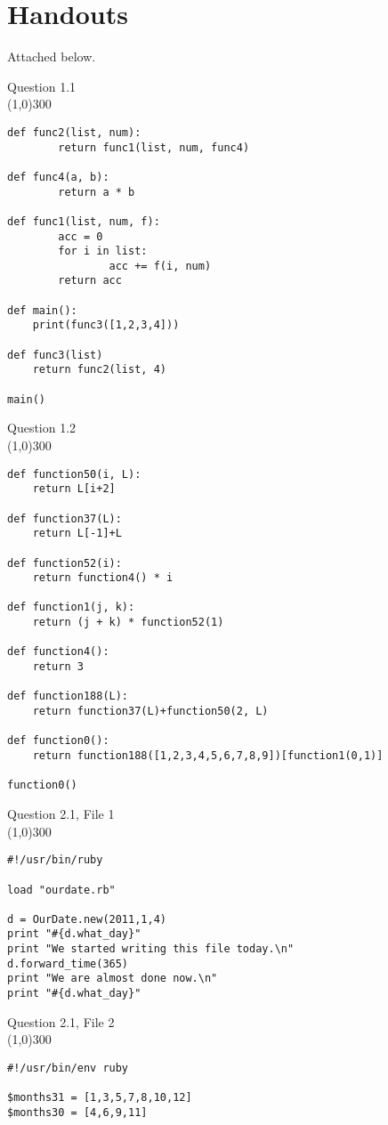 \documentclass{article}
\begin{document}
\section{Handouts}
Attached below.
\newpage
{\Large
Question 1.1 \\
\line(1,0){300}
\begin{verbatim}
def func2(list, num):
        return func1(list, num, func4)

def func4(a, b):
        return a * b

def func1(list, num, f):
        acc = 0
        for i in list:
                acc += f(i, num)
        return acc

def main():
    print(func3([1,2,3,4]))

def func3(list)
    return func2(list, 4)

main()

\end{verbatim}
\newpage
Question 1.2 \\
\line(1,0){300}
\begin{verbatim}
def function50(i, L):
    return L[i+2]

def function37(L):
    return L[-1]+L

def function52(i):
    return function4() * i

def function1(j, k):
    return (j + k) * function52(1)

def function4():
    return 3

def function188(L):
    return function37(L)+function50(2, L)

def function0():
    return function188([1,2,3,4,5,6,7,8,9])[function1(0,1)]

function0()
\end{verbatim}

\newpage
Question 2.1, File 1 \\
\line(1,0){300}
\begin{verbatim}
#!/usr/bin/ruby

load "ourdate.rb"

d = OurDate.new(2011,1,4)
print "#{d.what_day}"
print "We started writing this file today.\n"
d.forward_time(365)
print "We are almost done now.\n"
print "#{d.what_day}"

\end{verbatim}
\newpage
Question 2.1, File 2 \\
\line(1,0){300}
\begin{verbatim}
#!/usr/bin/env ruby

$months31 = [1,3,5,7,8,10,12]
$months30 = [4,6,9,11]


\end{verbatim}}
\end{document}
